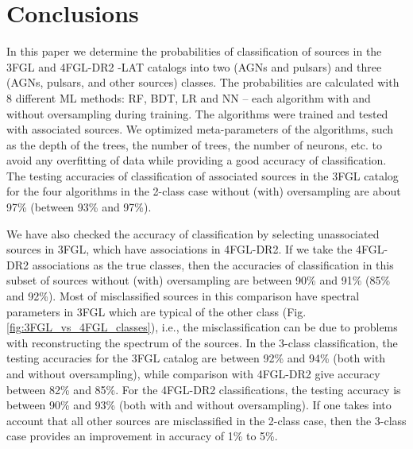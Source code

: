 \section{Conclusions}

In this paper we determine the probabilities of classification of sources in the 3FGL and 4FGL-DR2 \Fermi-LAT catalogs
into two (AGNs and pulsars) and three (AGNs, pulsars, and other sources) classes.
The probabilities are calculated with 8 different ML methods: RF, BDT, LR and NN -- each algorithm with and without oversampling during training.
The algorithms were trained and tested with associated sources.
We optimized meta-parameters of the algorithms, such as the depth of the trees, the number of trees, the number of neurons, etc. to avoid any overfitting of data while providing a good accuracy of classification.
The testing accuracies of classification of associated sources in the 3FGL catalog for the four algorithms in the 2-class case without (with) oversampling are about  97\% (between 93\% and 97\%).

We have also checked the accuracy of classification by selecting unassociated sources in 3FGL, which have associations in 4FGL-DR2.
If we take the 4FGL-DR2 associations as the true classes, then the accuracies of classification in this subset of sources 
without (with) oversampling are between 90\% and 91\% (85\% and 92\%).
Most of misclassified sources in this comparison have spectral parameters in 3FGL which are typical of the other class (Fig. \ref{fig:3FGL_vs_4FGL_classes}), i.e.,  the misclassification can be due to problems with reconstructing the spectrum of the sources.
In the 3-class classification, the testing accuracies for the 3FGL catalog are between 92\% and 94\% (both with and without oversampling), while comparison with 4FGL-DR2 give accuracy between 82\% and 85\%. For the 4FGL-DR2 classifications, the testing accuracy is between 90\% and 93\% (both with and without oversampling). If one takes into account that all other sources are misclassified in the 2-class case, then the 3-class case provides an improvement in accuracy of 1\% to 5\%.

